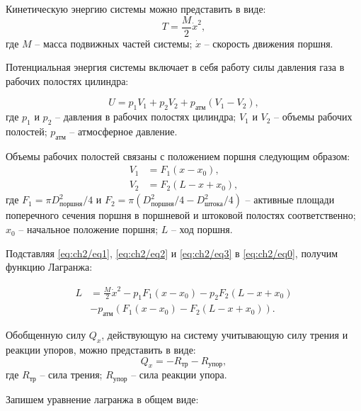 Кинетическую энергию системы можно представить в виде:
\begin{equation}
\label{eq:ch2/eq1}
    T = \frac{M}{2} \dot{x}^2,
\end{equation}
где $M$ -- масса подвижных частей системы; $\dot{x}$ -- скорость движения поршня.

Потенциальная энергия системы включает в себя работу силы давления газа в рабочих полостях цилиндра:

\begin{equation}
\label{eq:ch2/eq2}
    U = p_1 V_1 + p_2 V_2 + p_\text{атм} (V_1 - V_2),
\end{equation}
где $p_1$ и $p_2$ -- давления в рабочих полостях цилиндра;
$V_1$ и $V_2$ -- объемы рабочих полостей;
$p_\text{атм}$ -- атмосферное давление.

Объемы рабочих полостей связаны с положением поршня следующим образом:
\begin{equation}
\label{eq:ch2/eq3}
    \begin{aligned}
        V_1 & = F_1 (x - x_0),     \\
        V_2 & = F_2 (L - x + x_0),
    \end{aligned}
\end{equation}
где $F_1=\pi D_{поршня}^2/4 $ и $F_2 = \pi (D_{поршня}^2/4 - D_{штока}^2/4)$ -- активные площади поперечного сечения поршня в поршневой и штоковой полостях соответственно;
$x_0$ -- начальное положение поршня;
$L$ -- ход поршня.

Подставляя \eqref{eq:ch2/eq1}, \eqref{eq:ch2/eq2} и \eqref{eq:ch2/eq3} в \eqref{eq:ch2/eq0}, получим функцию Лагранжа:

\begin{equation}
\label{eq:ch2/eq4}
    \begin{aligned}
        L & = \frac{M}{2} \dot{x}^2 - p_1 F_1 (x - x_0) - p_2 F_2 (L - x + x_0) \\
          & - p_\text{атм} (F_1 (x - x_0) - F_2 (L - x + x_0)).
    \end{aligned}
\end{equation}

Обобщенную силу $Q_x$, действующую на систему учитывающую силу трения и реакции упоров, можно представить в виде:
\begin{equation}
\label{eq:ch2/eq5}
    Q_x = - R_{\text{тр}} - R_{\text{упор}},
\end{equation}
где $R_{\text{тр}}$ -- сила трения; $R_{\text{упор}}$ -- сила реакции упора.

Запишем уравнение лагранжа в общем виде:

